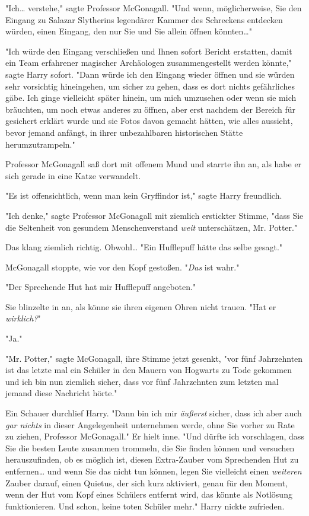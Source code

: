 {"Ich… verstehe," sagte Professor McGonagall. "Und wenn, möglicherweise, Sie den Eingang zu Salazar Slytherins legendärer Kammer des Schreckens entdecken würden, einen Eingang, den nur Sie und Sie allein öffnen könnten…"

"Ich würde den Eingang verschließen und Ihnen sofort Bericht erstatten, damit ein Team erfahrener magischer Archäologen zusammengestellt werden könnte," sagte Harry sofort. "Dann würde ich den Eingang wieder öffnen und sie würden sehr vorsichtig hineingehen, um sicher zu gehen, dass es dort nichts gefährliches gäbe. Ich ginge vielleicht später hinein, um mich umzusehen oder wenn sie mich bräuchten, um noch etwas anderes zu öffnen, aber erst nachdem der Bereich für gesichert erklärt wurde und sie Fotos davon gemacht hätten, wie alles aussieht, bevor jemand anfängt, in ihrer unbezahlbaren historischen Stätte herumzutrampeln."

Professor McGonagall saß dort mit offenem Mund und starrte ihn an, als habe er sich gerade in eine Katze verwandelt.

"Es ist offensichtlich, wenn man kein Gryffindor ist," sagte Harry freundlich.

"Ich denke," sagte Professor McGonagall mit ziemlich erstickter Stimme, "dass Sie die Seltenheit von gesundem Menschenverstand \emph{weit} unterschätzen, Mr. Potter."

Das klang ziemlich richtig. Obwohl… "Ein Hufflepuff hätte das selbe gesagt."

McGonagall stoppte, wie vor den Kopf gestoßen. "\emph{Das} ist wahr."

"Der Sprechende Hut hat mir Hufflepuff angeboten."

Sie blinzelte in an, als könne sie ihren eigenen Ohren nicht trauen. "Hat er \emph{wirklich?}"

"Ja."

"Mr. Potter," sagte McGonagall, ihre Stimme jetzt gesenkt, "vor fünf Jahrzehnten ist das letzte mal ein Schüler in den Mauern von Hogwarts zu Tode gekommen und ich bin nun ziemlich sicher, dass vor fünf Jahrzehnten zum letzten mal jemand diese Nachricht hörte."

Ein Schauer durchlief Harry. "Dann bin ich mir \emph{äußerst} sicher, dass ich aber auch \emph{gar nichts} in dieser Angelegenheit unternehmen werde, ohne Sie vorher zu Rate zu ziehen, Professor McGonagall." Er hielt inne. "Und dürfte ich vorschlagen, dass Sie die besten Leute zusammen trommeln, die Sie finden können und versuchen herauszufinden, ob es möglich ist, diesen Extra-Zauber vom Sprechenden Hut zu entfernen… und wenn Sie das nicht tun können, legen Sie vielleicht einen \emph{weiteren} Zauber darauf, einen Quietus, der sich kurz aktiviert, genau für den Moment, wenn der Hut vom Kopf eines Schülers entfernt wird, das könnte als Notlösung funktionieren. Und schon, keine toten Schüler mehr." Harry nickte zufrieden.

}
